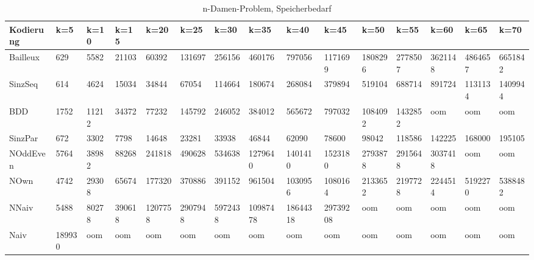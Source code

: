 \documentclass[a4,abstract=on]{scrartcl}
\begin{document}
\begin{landscape}
 \begin{table}[h!]
    \small
    \setlength{\tabcolsep}{0.11cm}
     \centering
     \begin{tabular}[width=\textwidth]{|l|l|l|l|l|l|l|l|l|l|l|l|l|l|l|}
	\hline
       \textbf{Kodierung}  & \textbf{k=5} & \textbf{k=10} & \textbf{k=15} &\textbf{k=20} &\textbf{k=25} &\textbf{k=30} &\textbf{k=35} &\textbf{k=40} &\textbf{k=45} &\textbf{k=50} &\textbf{k=55} &\textbf{k=60} &\textbf{k=65} &\textbf{k=70}\\
	\hline
	Bailleux & 629 & 5582 & 21103 & 60392 & 131697 & 256156 & 460176 & 797056 & 1171699 & 1808296 & 2778507 & 3621148 & 4864657 & 6651842\\
\hline
	SinzSeq & 614 & 4624 & 15034 & 34844 & 67054 & 114664 & 180674 & 268084 & 379894 & 519104 & 688714 & 891724 & 1131134 & 1409944 \\
\hline
	BDD & 1752 & 11212 & 34372 & 77232 & 145792 & 246052 & 384012 &565672 &797032 &1084092 & 1432852 & oom & oom & oom\\
\hline
	SinzPar & 672 & 3302 & 7798 & 14648 & 23281 & 33938 & 46844 & 62090 & 78600 & 98042 & 118586 & 142225 & 168000 & 195105 \\
\hline
	NOddEven & 5764 & 38982 & 88268 & 241818 & 490628 & 534638 & 1279640 & 1401410 & 1523180 & 2793878 & 2915648 & 3037418 & oom & oom\\
\hline
	NOwn & 4742 & 29308 & 65674 & 177320 & 370886 & 391152 & 961504 & 1030956 & 1080164 & 2133652 & 2197728 & 2244514 & 5192270 & 5388482\\
 \hline
	NNaiv & 5488 & 80278 & 390618 & 1207758 & 2907948 & 5972438 & 10987478 & 18644318 & 29739208 & oom & oom & oom & oom & oom\\
\hline
	Naiv & 189930 & oom &  oom &  oom &  oom &  oom &  oom &  oom &  oom &  oom &  oom &  oom &  oom &  oom\\
\hline
       
     \end{tabular}

     \caption{n-Damen-Problem, Speicherbedarf}
     \label{tbl:beispieltabelle}


\end{table}
\end{landscape}
\end{document}

